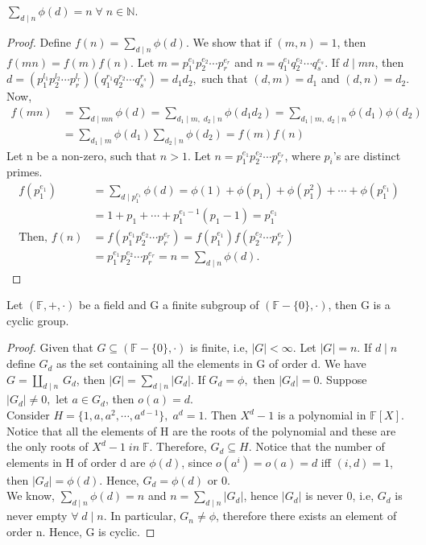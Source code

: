 \documentclass[10pt,a4paper]{article}
\begin{document}
\begin{lemma}
$\sum_{d\mid n}\phi(d)=n\;\forall\;n\in\mathbb{N}.$
\end{lemma}

\begin{proof}
Define $f(n)=\sum_{d\mid n}\phi(d)$. We show that if $(m,n)=1$, then $f(mn)=f(m)f(n).$ Let $m=p^{e_1}_1p^{e_2}_2\cdots p^{e_r}_r$ and $n=q^{e_1}_1q^{e_2}_2\cdots q^{e_s}_s$. If $d\mid mn$, then $d=(p^{l_1}_1p^{l_2}_2\cdots p^{l_r}_r)(q^{r_1}_1q^{r_2}_2\cdots q^{r_s}_s)=d_1d_2,$ such that $(d,m)=d_1$ and $(d,n)=d_2.$
Now,
\begin{align*}
f(mn)&=\sum_{d\mid mn}\phi(d) = \sum_{d_1\mid m,\;d_2\mid n}\phi(d_1d_2)= \sum_{d_1\mid m,\;d_2\mid n}\phi(d_1)\phi(d_2)\\
&=\sum_{d_1\mid m}\phi(d_1)\sum_{d_2\mid n}\phi(d_2)=f(m)f(n)
\end{align*}
Let n be a non-zero, such that $n>1$. Let $n=p^{e_1}_1p^{e_2}_2\cdots p^{e_r}_r$, where $p_i$'s are distinct primes.
\begin{align*}
f(p^{e_1}_1) &= \sum_{d\mid p^{e_1}_1}\phi(d) = \phi(1) + \phi(p_1) + \phi(p^2_1) + \cdots + \phi(p^{e_1}_1) \\
&= 1+p_1+\cdots+p^{e_1-1}_1(p_1-1) = p^{e_1}_1 \\
\text{Then, }f(n) &= f(p^{e_1}_1p^{e_2}_2\cdots p^{e_r}_r) = f(p^{e_1}_1)f(p^{e_2}_2\cdots p^{e_r}_r) \\
&= p^{e_1}_1p^{e_2}_2\cdots p^{e_r}_r = n = \sum_{d\mid n}\phi(d).
\end{align*}
\end{proof}

\begin{theorem}
Let $(\mathbb{F},+,\cdot)$ be a field and G a finite subgroup of $(\mathbb{F}-\{0\},\cdot)$, then G is a cyclic group.
\end{theorem}

\begin{proof}
Given that $G\subseteq (\mathbb{F}-\{0\},\cdot)$ is finite, i.e, $|G|<\infty$. Let $|G|=n.$ If $d\mid n$ define $G_d$ as the set containing all the elements in G of order d. We have $G=\coprod_{d\mid n}\,G_d$, then $|G|=\sum_{d\mid n}|G_d|$. If $G_d=\phi,$ then $|G_d|=0.$ Suppose $|G_d|\neq0,$ let $a\in G_d$, then $o(a)=d$. \\
Consider $H=\{1,a,a^2,\cdots,a^{d-1}\},\;a^d=1$. Then $X^d-1$ is a polynomial in $\mathbb{F}[X]$. Notice that all the elements of H are the roots of the polynomial and these are the only roots of $X^d-1\;in\;\mathbb{F}.$ Therefore, $G_d\subseteq H$. Notice that the number of elements in H of order d are $\phi(d)$, since $o(a^i)=o(a)=d$ iff $(i,d)=1$, then $|G_d|=\phi(d).$ Hence, $G_d = \phi(d)$ or $0$. \\
We know, $\sum_{d\mid n}\phi(d)=n$ and $n=\sum_{d\mid n}|G_d|$, hence $|G_d|$ is never 0, i.e, $G_d$ is never empty $\forall\;d\mid n$. In particular, $G_n\neq \phi$, therefore there exists an element of order n. Hence, G is cyclic.
\end{proof}
\end{document}
